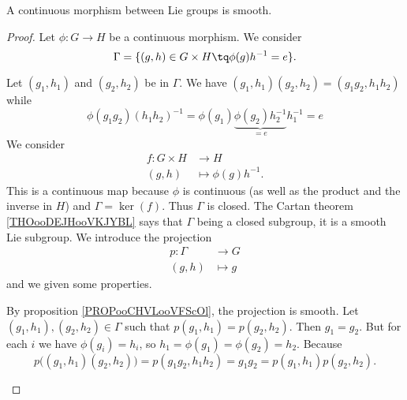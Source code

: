 \begin{proposition}
	A continuous morphism between Lie groups is smooth.
\end{proposition}

\begin{proof}
	Let \( \phi\colon G\to H\) be a continuous morphism. We consider
	\begin{equation}
		\Gamma=\{ (g,h)\in G\times H\tq \phi(g)h^{-1}=e \}.
	\end{equation}
	\begin{subproof}
		Let \( (g_1,h_1)\) and \( (g_2,h_2)\) be in \( \Gamma\). We have \( (g_1,h_1)(g_2,h_2)=(g_1g_2,h_1h_2)\) while
		\begin{equation}
			\phi(g_1g_2)(h_1h_2)^{-1}=\phi(g_1)\underbrace{\phi(g_2)h_2^{-1}}_{=e}h_1^{-1}=e
		\end{equation}
		We consider
		\begin{equation}
			\begin{aligned}
				f\colon G\times H & \to H                  \\
				(g,h)             & \mapsto \phi(g)h^{-1}.
			\end{aligned}
		\end{equation}
		This is a continuous map because \( \phi\) is continuous (as well as the product and the inverse in \( H\)) and \( \Gamma=\ker(f)\). Thus \( \Gamma\) is closed.
		The Cartan theorem \ref{THOooDEJHooVKJYBL} says that \( \Gamma\) being a closed subgroup, it is a smooth Lie subgroup.
		We introduce the projection
		\begin{equation}
			\begin{aligned}
				p\colon \Gamma & \to G     \\
				(g,h)          & \mapsto g
			\end{aligned}
		\end{equation}
		and we given some properties.
		\begin{subproof}
			\spitem[Smooth]
			By proposition \ref{PROPooCHVLooVFScOl}, the projection is smooth.
			\spitem[Bijective]
			Let \( (g_1,h_1),(g_2,h_2)\in \Gamma\) such that \( p(g_1,h_1)=p(g_2,h_2)\). Then \( g_1=g_2\). But for each \( i\) we have \( \phi(g_i)=h_i\), so \( h_1=\phi(g_1)=\phi(g_2)=h_2\).
			\spitem[Morphism]
			Because
			\begin{equation}
				p\big( (g_1,h_1)(g_2,h_2) \big)=p(g_1g_2,h_1h_2)=g_1g_2=p(g_1,h_1)p(g_2,h_2).

\end{equation}
\end{subproof}
\end{subproof}
\end{proof}
